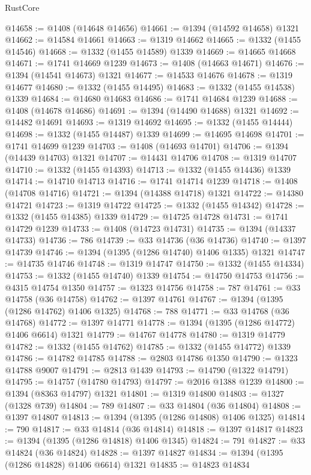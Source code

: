 \begin{lexlean}{RustCore}
\begin{coremodule}
@14658 := @1408 (@14648 @14656)
@14661 := @1394 (@14592 @14658) @1321
@14662 := @14584 @14661
@14663 := @1319 @14662
@14665 := @1332 (@1455 @14546)
@14668 := @1332 (@1455 @14589) @1339
@14669 := @14665 @14668
@14671 := @1741 @14669 @1239
@14673 := @1408 (@14663 @14671)
@14676 := @1394 (@14541 @14673) @1321
@14677 := @14533 @14676
@14678 := @1319 @14677
@14680 := @1332 (@1455 @14495)
@14683 := @1332 (@1455 @14538) @1339
@14684 := @14680 @14683
@14686 := @1741 @14684 @1239
@14688 := @1408 (@14678 @14686)
@14691 := @1394 (@14490 @14688) @1321
@14692 := @14482 @14691
@14693 := @1319 @14692
@14695 := @1332 (@1455 @14444)
@14698 := @1332 (@1455 @14487) @1339
@14699 := @14695 @14698
@14701 := @1741 @14699 @1239
@14703 := @1408 (@14693 @14701)
@14706 := @1394 (@14439 @14703) @1321
@14707 := @14431 @14706
@14708 := @1319 @14707
@14710 := @1332 (@1455 @14393)
@14713 := @1332 (@1455 @14436) @1339
@14714 := @14710 @14713
@14716 := @1741 @14714 @1239
@14718 := @1408 (@14708 @14716)
@14721 := @1394 (@14388 @14718) @1321
@14722 := @14380 @14721
@14723 := @1319 @14722
@14725 := @1332 (@1455 @14342)
@14728 := @1332 (@1455 @14385) @1339
@14729 := @14725 @14728
@14731 := @1741 @14729 @1239
@14733 := @1408 (@14723 @14731)
@14735 := @1394 (@14337 @14733)
@14736 := 786
@14739 := @33 @14736 (@36 @14736)
@14740 := @1397 @14739
@14746 := @1394 (@1395 (@1286 @14740) @1406 @1335) @1321
@14747 := @14735 @14746
@14748 := @1319 @14747
@14750 := @1332 (@1455 @14334)
@14753 := @1332 (@1455 @14740) @1339
@14754 := @14750 @14753
@14756 := @4315 @14754 @1350
@14757 := @1323 @14756
@14758 := 787
@14761 := @33 @14758 (@36 @14758)
@14762 := @1397 @14761
@14767 := @1394 (@1395 (@1286 @14762) @1406 @1325)
@14768 := 788
@14771 := @33 @14768 (@36 @14768)
@14772 := @1397 @14771
@14778 := @1394 (@1395 (@1286 @14772) @1406 @6614) @1321
@14779 := @14767 @14778
@14780 := @1319 @14779
@14782 := @1332 (@1455 @14762)
@14785 := @1332 (@1455 @14772) @1339
@14786 := @14782 @14785
@14788 := @2803 @14786 @1350
@14790 := @1323 @14788 @9007
@14791 := @2813 @1439
@14793 := @14790 (@1322 @14791)
@14795 := @14757 (@14780 @14793)
@14797 := @2016 @1388 @1239
@14800 := @1394 (@8363 @14797) @1321
@14801 := @1319 @14800
@14803 := @1327 (@1328 @739)
@14804 := 789
@14807 := @33 @14804 (@36 @14804)
@14808 := @1397 @14807
@14813 := @1394 (@1395 (@1286 @14808) @1406 @1325)
@14814 := 790
@14817 := @33 @14814 (@36 @14814)
@14818 := @1397 @14817
@14823 := @1394 (@1395 (@1286 @14818) @1406 @1345)
@14824 := 791
@14827 := @33 @14824 (@36 @14824)
@14828 := @1397 @14827
@14834 := @1394 (@1395 (@1286 @14828) @1406 @6614) @1321
@14835 := @14823 @14834

\end{coremodule}
\end{lexlean}
